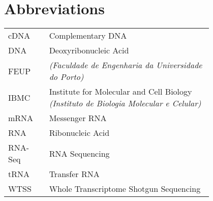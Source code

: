 \chapter*{Abbreviations}

\begin{flushleft}
\begin{tabular}{l p{0.8\linewidth}}
cDNA      & Complementary DNA\\
DNA       & Deoxyribonucleic Acid\\
FEUP      & \Feup{} \textit{(Faculdade de Engenharia da Universidade do Porto)}\\
IBMC      & Institute for Molecular and Cell Biology \textit{(Instituto de Biologia Molecular e Celular)}\\
mRNA      & Messenger RNA\\
RNA       & Ribonucleic Acid\\
RNA-Seq   & RNA Sequencing\\
tRNA      & Transfer RNA\\
WTSS      & Whole Transcriptome Shotgun Sequencing\\
\end{tabular}
\end{flushleft}

